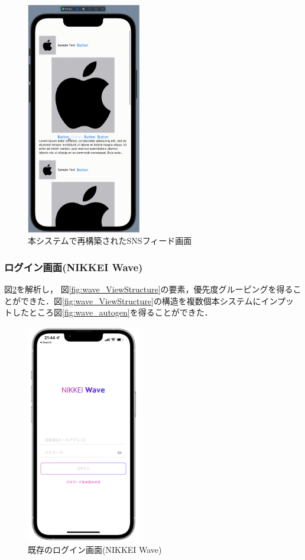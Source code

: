 \begin{figure}[htbp]
  \begin{minipage}{\hsize}
    \begin{center}
       \includegraphics[width=50mm]{img/Instagram_autogen.png}
    \end{center}
    \caption{本システムで再構築されたSNSフィード画面}
    \label{fig:instagram_autogen}
  \end{minipage}
\end{figure}

\subsubsection{ログイン画面(NIKKEI Wave)}
図\ref{fig:wave_screenshot}を解析し， 図\ref{fig:wave_ViewStructure}の要素，優先度グルーピングを得ることができた．図\ref{fig:wave_ViewStructure}の構造を複数個本システムにインプットしたところ図\ref{fig:wave_autogen}を得ることができた．

\begin{figure}[htbp]
  \begin{minipage}{\hsize}
    \begin{center}
       \includegraphics[width=50mm]{img/wave_screenshot.png}
    \end{center}
    \caption{既存のログイン画面(NIKKEI Wave)}
    \label{fig:wave_screenshot}
  \end{minipage}
\end{figure}

